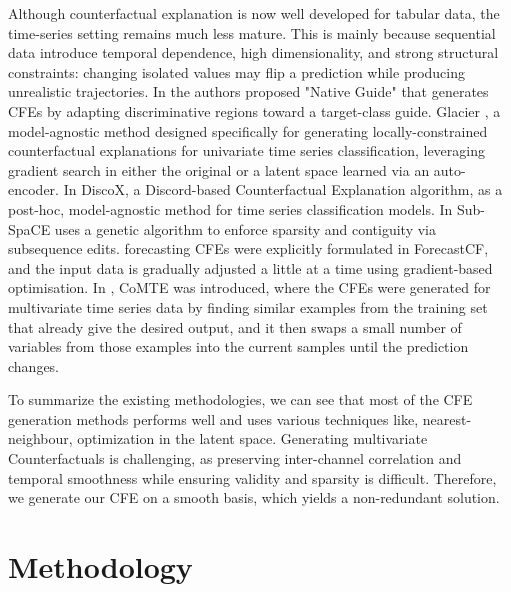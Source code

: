\documentclass[runningheads]{llncs}
\begin{document}
	Although counterfactual explanation is now well developed for tabular data, the time-series setting remains much less mature. This is mainly because sequential data introduce temporal dependence, high dimensionality, and strong structural constraints: changing isolated values may flip a prediction while producing unrealistic trajectories. In \cite{delaney2021instance} the authors proposed "Native Guide" that generates CFEs by adapting discriminative regions toward a target-class guide. Glacier \cite{wang2024glacier}, a model-agnostic method designed specifically for generating locally-constrained counterfactual explanations for univariate time series classification, leveraging gradient search in either the original or a latent space learned via an auto-encoder. In \cite{bahri2024discord} DiscoX, a Discord-based Counterfactual Explanation algorithm, as a post-hoc, model-agnostic method for time series classification models. In \cite{Sub-SpaCE_10.1007/978-3-031-63800-8_1}Sub-SpaCE uses a genetic algorithm to enforce sparsity and contiguity via subsequence edits. forecasting CFEs were explicitly formulated in ForecastCF\cite{wang2023counterfactual}, and the input data is gradually adjusted a little at a time using gradient-based optimisation. In \cite{CoMTE_9462056}, CoMTE was introduced, where the CFEs were generated for multivariate time series data by finding similar examples from the training set that already give the desired output, and it then swaps a small number of variables from those examples into the current samples until the prediction changes.

    
	To summarize the existing methodologies, we can see that most of the CFE generation methods performs well and uses various techniques like, nearest-neighbour, optimization in the latent space. Generating multivariate Counterfactuals is challenging, as preserving inter-channel correlation and temporal smoothness while ensuring validity and sparsity is difficult. Therefore, we generate our CFE on a smooth basis, which yields a non-redundant solution.
	
	\section{Methodology}
	
\end{document}
